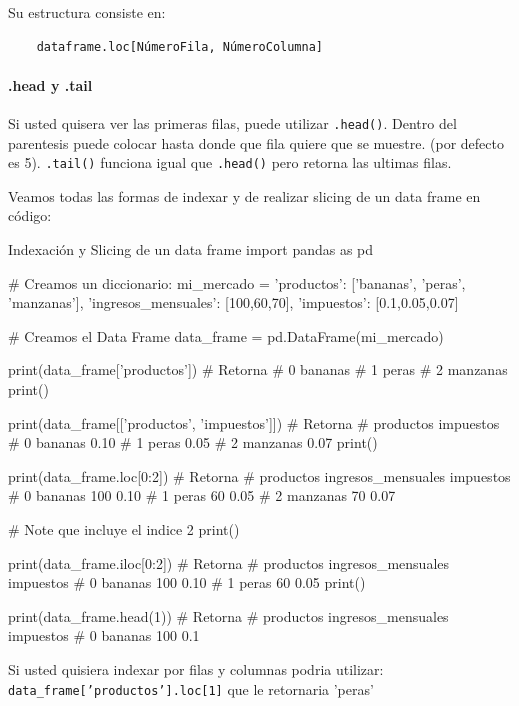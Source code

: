 Su estructura consiste en:
\begin{verbatim}
    dataframe.loc[NúmeroFila, NúmeroColumna]
\end{verbatim}


\paragraph{.head y .tail}
Si usted quisera ver las primeras filas, puede utilizar \texttt{.head()}. Dentro del parentesis puede colocar hasta donde que fila quiere que se muestre. (por defecto es 5). \texttt{.tail()} funciona igual que \texttt{.head()} pero retorna las ultimas filas.

Veamos todas las formas de indexar y de realizar slicing de un data frame en código:
\begin{pycode}{Indexación y Slicing de un data frame}
import pandas as pd

# Creamos un diccionario:
mi_mercado = {
    'productos': ['bananas', 'peras', 'manzanas'], 
    'ingresos_mensuales': [100,60,70],
    'impuestos': [0.1,0.05,0.07]
}

# Creamos el Data Frame
data_frame = pd.DataFrame(mi_mercado)


print(data_frame['productos']) # Retorna
# 0     bananas
# 1       peras
# 2    manzanas
print()

print(data_frame[['productos', 'impuestos']]) # Retorna
#   productos  impuestos
# 0   bananas       0.10
# 1     peras       0.05
# 2  manzanas       0.07
print()

print(data_frame.loc[0:2]) # Retorna
#   productos  ingresos_mensuales  impuestos
# 0   bananas                 100       0.10
# 1     peras                  60       0.05
# 2  manzanas                  70       0.07

# Note que incluye el indice 2
print()

print(data_frame.iloc[0:2]) # Retorna
#   productos  ingresos_mensuales  impuestos
# 0   bananas                 100       0.10
# 1     peras                  60       0.05
print()

print(data_frame.head(1)) # Retorna
#   productos  ingresos_mensuales  impuestos
# 0   bananas                 100        0.1
\end{pycode}

\begin{ejemplo}
    Si usted quisiera indexar por filas y columnas podria utilizar: \texttt{data\_frame['productos'].loc[1]} que le retornaria 'peras'
\end{ejemplo}



